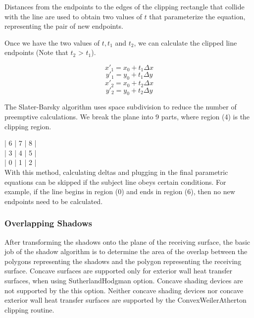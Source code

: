 Distances from the endpoints to the edges of the clipping rectangle that collide with the line are used to obtain two values of $t$ that parameterize the equation, representing the pair of new endpoints.

Once we have the two values of $t, t_1$ and $t_2$, we can calculate the clipped line endpoints (Note that $t_2$ > $t_1$).

\begin{equation}
x'_1 = x_0 + t_1 \Delta x
\end{equation}
\begin{equation}
y'_1 = y_0 + t_1 \Delta y
\end{equation}
\begin{equation}
x'_2 = x_0 + t_2 \Delta x
\end{equation}
\begin{equation}
y'_2 = y_0 + t_2 \Delta y
\end{equation}

The Slater-Barsky algorithm uses space subdivision to reduce the number of preemptive calculations. We break the plane into 9 parts, where region (4) is the clipping region.


| 6 | 7 | 8 | \\
| 3 | 4 | 5 | \\
| 0 | 1 | 2 | \\


With this method, calculating deltas and plugging in the final parametric equations can be skipped if the subject line obeys certain conditions. For example, if the line begins in region (0) and ends in region (6), then no new endpoints need to be calculated.

\subsubsection{Overlapping Shadows}\label{overlapping-shadows}

After transforming the shadows onto the plane of the receiving surface, the basic job of the shadow algorithm is to determine the area of the overlap between the polygons representing the shadows and the polygon representing the receiving surface. Concave surfaces are supported only for exterior wall heat transfer surfaces, when using SutherlandHodgman option. Concave shading devices are not supported by the this option. Neither concave shading devices nor concave exterior wall heat transfer surfaces are supported by the ConvexWeilerAtherton clipping routine.


